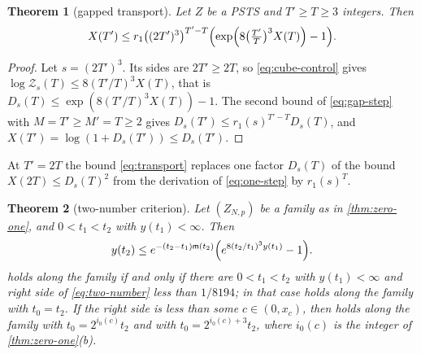\documentclass[11pt,a4paper]{amsart}
\newtheorem{theorem}{Theorem}[section]
\theoremstyle{definition}
\theoremstyle{remark}
\numberwithin{equation}{section}
\newcommand{\PSTS}{\textup{PSTS}}          %
\newcommand{\TT}{\mathbb{T}}               %
\newcommand{\Zc}{\mathcal{Z}}              %
\newcommand{\Zs}[2]{\Zc_{#1}(#2)}          %
\newcommand{\Dexc}[2]{D_{#1}(#2)}          %
\newcommand{\cube}[1]{(2#1)^3}             %
\newcommand{\Mcirc}{\text{\upshape(M$^{\circ}$)}}   %
\newcommand{\Bcirc}{\text{\upshape(B$^{\circ}$)}}   %
\newcommand{\tzero}{t_0}                   %
\begin{document}
\begin{theorem}[gapped transport]\label{thm:gapped-transport}
Let $Z$ be a \PSTS{} and $T'\ge T\ge3$ integers. Then
\begin{equation}\label{eq:transport}
X(T')\le r_1\bigl(\cube{T'}\bigr)^{T'-T}\Bigl(\exp\Bigl(8\bigl(\tfrac{T'}{T}\bigr)^3X(T)\Bigr)-1\Bigr).
\end{equation}
\end{theorem}

\begin{proof}
Let $s=\cube{T'}$. Its sides are $2T'\ge2T$, so \eqref{eq:cube-control} gives $\log\Zs{s}{T}\le8(T'/T)^3X(T)$, that is $\Dexc{s}{T}\le\exp(8(T'/T)^3X(T))-1$. The second bound of \eqref{eq:gap-step} with $M=T'\ge M'=T\ge2$ gives $\Dexc{s}{T'}\le r_1(s)^{T'-T}\Dexc{s}{T}$, and $X(T')=\log(1+\Dexc{s}{T'})\le\Dexc{s}{T'}$.
\end{proof}

At $T'=2T$ the bound \eqref{eq:transport} replaces one factor $\Dexc{s}{T}$ of the bound $X(2T)\le\Dexc{s}{T}^2$ from the derivation of \eqref{eq:one-step} by $r_1(s)^T$.

\begin{theorem}[two-number criterion]\label{thm:two-number}
Let $(Z_{N,p})$ be a family as in \cref{thm:zero-one}, and $0<t_1<t_2$ with $y(t_1)<\infty$. Then
\begin{equation}\label{eq:two-number}
y(t_2)\le e^{-(t_2-t_1)\mathsf m(t_2)}\Bigl(e^{8(t_2/t_1)^3y(t_1)}-1\Bigr).
\end{equation}
\Mcirc{} holds along the family if and only if there are $0<t_1<t_2$ with $y(t_1)<\infty$ and right side of \eqref{eq:two-number} less than $1/8194$; in that case \Mcirc{} holds along the family with $\tzero=t_2$. If the right side is less than some $c\in(0,x_c)$, then \Bcirc{} holds along the family with $\tzero=2^{i_0(c)}t_2$ and \Mcirc{} with $\tzero=2^{i_0(c)+3}t_2$, where $i_0(c)$ is the integer of \cref{thm:zero-one}\textup{(b)}.
\end{theorem}
\end{document}
